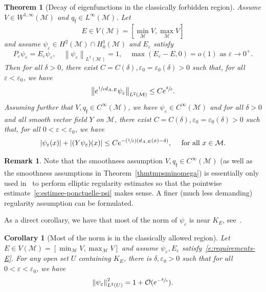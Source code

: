 \documentclass[11pt]{article}
\numberwithin{equation}{section}
\newcommand{\Psfrac}[2]{(\sfrac{#1}{#2})}
\newtheorem{theorem}[lemma]{Theorem}
\newtheorem{corollary}[lemma]{Corollary}
\theoremstyle{definition}
\newtheorem{remark}[lemma]{Remark}
\newcommand{\M}{\ensuremath{\mathcal M}}
\newcommand\grandon[1]{\mathcal{O}(#1)}
\newcommand{\f}{\ensuremath{\mathfrak{f}}}
\newcommand\nor[2]{\left\|#1\right\|_{#2}}
\newcommand\bnor[2]{\bigl\|#1\bigr\|_{#2}}
\let\eps\varepsilon
\newcommand{\qf}{q_{\f}}
\begin{document}
\begin{theorem}[Decay of eigenfunctions in the classically forbidden region]
\label{t:decay-agmon}
Assume $V \in W^{1,\infty}(\M)$ and $\qf \in L^\infty(\M)$. Let
\[
E \in V(\M) = [\min_\M V, \max_\M V]
\]
and assume $\psi_\eps \in H^2(\M) \cap H^1_0(\M)$ and $E_\eps$ satisfy
\begin{equation}
\label{e:requirements-E}
P_\eps \psi_\eps = E_\eps \psi_\eps, \quad \nor{\psi_\eps}{L^2(\M)} = 1, \quad \max(E_\eps -E, 0) = o(1) \text{ as } \eps \to 0^+.
\end{equation}
Then for all $\delta>0$, there exist $C=C(\delta),\eps_0=\eps_0(\delta)>0$ such that, for all $\eps<\eps_0$, we have
\begin{equation}
\label{e:estimee-L2-psi}
\bnor{ e^{\sfrac{1}{\eps} d_{A,E}} \psi_\eps}{L^2(\M)}\leq C e^{\sfrac{\delta}{\eps}}.
\end{equation}
Assuming further that $V, \qf \in C^\infty(\M)$, we have $\psi_\eps \in C^\infty(\M)$ and for all $\delta>0$ and all smooth vector field $Y$ on $\M$, there exist $C=C(\delta),\eps_0=\eps_0(\delta)>0$ such that, for all $0<\eps<\eps_0$, we have
\begin{equation}
\label{e:estimee-ponctuelle-psi}
|\psi_\eps(x)| + |(Y\psi_\eps)(x)| \leq C e^{-\Psfrac{1}{\eps} (d_{A,E}(x)-\delta)}, \quad \text{ for all } x \in \M.
\end{equation}
\end{theorem}
\begin{remark}
\label{r:Cinfty-reg-bdry}
Note that the smoothness assumption $V, \qf \in C^\infty(\M)$ (as well as the smoothness assumptions in Theorem~\ref{thmtmpsminomega}) is essentially only used in~\cite{HS84,Helffer:booksemiclassic,DS:book} to perform elliptic regularity estimates so that the pointwise estimate~\eqref{e:estimee-ponctuelle-psi} makes sense. A finer (much less demanding) regularity assumption can be formulated.
\end{remark}

As a direct corollary, we have that most of the norm of $\psi_\eps$ is near $K_E$, see~\cite[Cor.\,3.3.2]{Helffer:booksemiclassic}.
\begin{corollary}[Most of the norm is in the classically allowed region]
\label{corpresx0omega}
Let $E \in V(\M) = [\min_\M V, \max_\M V]$ and assume $\psi_\eps, E_\eps$ satisfy~\eqref{e:requirements-E}.
For any open set $U$ containing $K_E$, there is $\delta, \eps_0 >0$ such that for all $0<\eps< \eps_0$, we have
\[
\nor{\psi_\eps}{L^2(U)}^2 = 1 + \grandon{e^{-\sfrac{\delta}{\eps}}}.
\]
\end{corollary}
\end{document}
